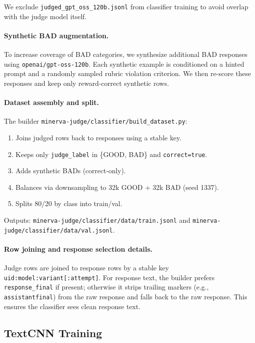 We exclude \texttt{judged\_gpt\_oss\_120b.jsonl} from classifier training to
avoid overlap with the judge model itself.

\paragraph{Synthetic BAD augmentation.}
To increase coverage of BAD categories, we synthesize additional BAD responses
using \texttt{openai/gpt-oss-120b}. Each synthetic example is conditioned on a
hinted prompt and a randomly sampled rubric violation criterion. We then re-score
these responses and keep only reward-correct synthetic rows.

\paragraph{Dataset assembly and split.}
The builder \texttt{minerva-judge/classifier/build\_dataset.py}:
\begin{enumerate}
  \item Joins judged rows back to responses using a stable key.
  \item Keeps only \texttt{judge\_label} in \{GOOD, BAD\} and \texttt{correct=true}.
  \item Adds synthetic BADs (correct-only).
  \item Balances via downsampling to 32k GOOD + 32k BAD (seed 1337).
  \item Splits 80/20 by class into train/val.
\end{enumerate}
Outputs:
\texttt{minerva-judge/classifier/data/train.jsonl} and
\texttt{minerva-judge/classifier/data/val.jsonl}.

\paragraph{Row joining and response selection details.}
Judge rows are joined to response rows by a stable key
\texttt{uid:model:variant[:attempt]}. For response text, the builder prefers
\texttt{response\_final} if present; otherwise it strips trailing markers (e.g.,
\texttt{assistantfinal}) from the raw response and falls back to the raw response.
This ensures the classifier sees clean response text.

\subsection{TextCNN Training}
\label{subsec:textcnn-training}

